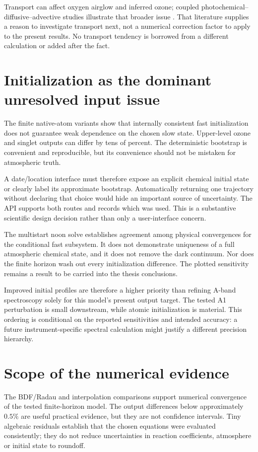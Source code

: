 Transport can affect oxygen airglow and inferred ozone; coupled photochemical--diffusive--advective studies illustrate that broader issue \citep{zhu2007}. That literature supplies a reason to investigate transport next, not a numerical correction factor to apply to the present results. No transport tendency is borrowed from a different calculation or added after the fact.

\section{Initialization as the dominant unresolved input issue}
The finite native-atom variants show that internally consistent fast initialization does not guarantee weak dependence on the chosen slow state. Upper-level ozone and singlet outputs can differ by tens of percent. The deterministic bootstrap is convenient and reproducible, but its convenience should not be mistaken for atmospheric truth.

A date/location interface must therefore expose an explicit chemical initial state or clearly label its approximate bootstrap. Automatically returning one trajectory without declaring that choice would hide an important source of uncertainty. The API supports both routes and records which was used. This is a substantive scientific design decision rather than only a user-interface concern.

The multistart noon solve establishes agreement among physical convergences for the conditional fast subsystem. It does not demonstrate uniqueness of a full atmospheric chemical state, and it does not remove the dark continuum. Nor does the finite horizon wash out every initialization difference. The plotted sensitivity remains a result to be carried into the thesis conclusions.

Improved initial profiles are therefore a higher priority than refining A-band spectroscopy solely for this model's present output target. The tested A1 perturbation is small downstream, while atomic initialization is material. This ordering is conditional on the reported sensitivities and intended accuracy: a future instrument-specific spectral calculation might justify a different precision hierarchy.

\section{Scope of the numerical evidence}
The BDF/Radau and interpolation comparisons support numerical convergence of the tested finite-horizon model. The output differences below approximately $0.5\%$ are useful practical evidence, but they are not confidence intervals. Tiny algebraic residuals establish that the chosen equations were evaluated consistently; they do not reduce uncertainties in reaction coefficients, atmosphere or initial state to roundoff.

